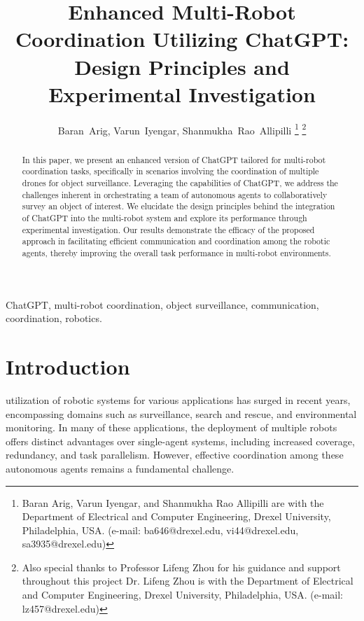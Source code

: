 \documentclass[journal]{IEEEtran}
\begin{document}
\title{Enhanced Multi-Robot Coordination Utilizing ChatGPT: Design Principles and Experimental Investigation}

\author{Baran~Arig,
        Varun~Iyengar,
       Shanmukha~Rao~Allipilli
\thanks{Baran Arig, Varun Iyengar, and Shanmukha Rao Allipilli are with the Department of Electrical and Computer Engineering, Drexel University, Philadelphia, USA. (e-mail: ba646@drexel.edu, vi44@drexel.edu, sa3935@drexel.edu)}
\thanks{Also special thanks to Professor Lifeng Zhou for his guidance and support throughout this project Dr. Lifeng Zhou is with the Department of Electrical and Computer Engineering, Drexel University, Philadelphia, USA. (e-mail: lz457@drexel.edu)}
}

\maketitle

\begin{abstract}
In this paper, we present an enhanced version of ChatGPT tailored for multi-robot coordination tasks, specifically in scenarios involving the coordination of multiple drones for object surveillance. Leveraging the capabilities of ChatGPT, we address the challenges inherent in orchestrating a team of autonomous agents to collaboratively survey an object of interest. We elucidate the design principles behind the integration of ChatGPT into the multi-robot system and explore its performance through experimental investigation. Our results demonstrate the efficacy of the proposed approach in facilitating efficient communication and coordination among the robotic agents, thereby improving the overall task performance in multi-robot environments. 
\end{abstract}

\begin{IEEEkeywords}
ChatGPT, multi-robot coordination, object surveillance, communication, coordination, robotics.
\end{IEEEkeywords}

\section{Introduction}
 utilization of robotic systems for various applications has surged in recent years, encompassing domains such as surveillance, search and rescue, and environmental monitoring. In many of these applications, the deployment of multiple robots offers distinct advantages over single-agent systems, including increased coverage, redundancy, and task parallelism. However, effective coordination among these autonomous agents remains a fundamental challenge. 
\end{document}
